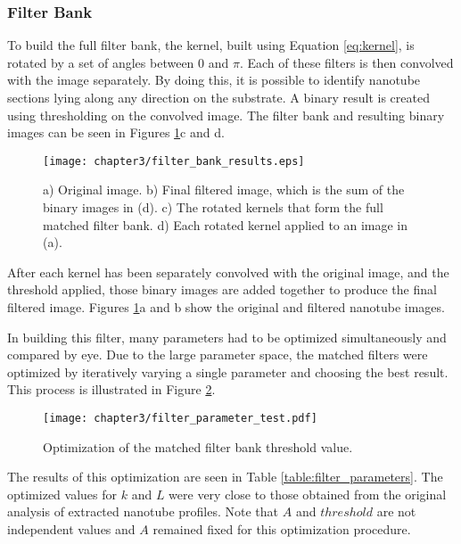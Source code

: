 \subsubsection{Filter Bank}

To build the full filter bank, the kernel, built using Equation \ref{eq:kernel}, is rotated by a set of angles between $0$ and $\pi$. Each of these filters is then convolved with the image separately. By doing this, it is possible to identify nanotube sections lying along any direction on the substrate. A binary result is created using thresholding on the convolved image. The filter bank and resulting binary images can be seen in Figures \ref{fig:filter_bank_results}c and d. 

\begin{figure}
	\centering
	\texttt{[image: chapter3/filter\_bank\_results.eps]}
	\caption{a) Original image. b) Final filtered image, which is the sum of the binary images in (d). c) The rotated kernels that form the full matched filter bank. d) Each rotated kernel applied to an image in (a).}
	\label{fig:filter_bank_results}
\end{figure}

After each kernel has been separately convolved with the original image, and the threshold applied, those binary images are added together to produce the final filtered image. Figures \ref{fig:filter_bank_results}a and b show the original and filtered nanotube images. 

In building this filter, many parameters had to be optimized simultaneously and compared by eye. Due to the large parameter space, the matched filters were optimized by iteratively varying a single parameter and choosing the best result. This process is illustrated in Figure \ref{fig:filter_parameter_test}.

\begin{figure}
	\centering
	\texttt{[image: chapter3/filter\_parameter\_test.pdf]}
	\caption{Optimization of the matched filter bank threshold value.}
	\label{fig:filter_parameter_test}
\end{figure}

The results of this optimization are seen in Table \ref{table:filter_parameters}. The optimized values for $k$ and $L$ were very close to those obtained from the original analysis of extracted nanotube profiles. Note that $A$ and $threshold$ are not independent values and $A$ remained fixed for this optimization procedure. 

